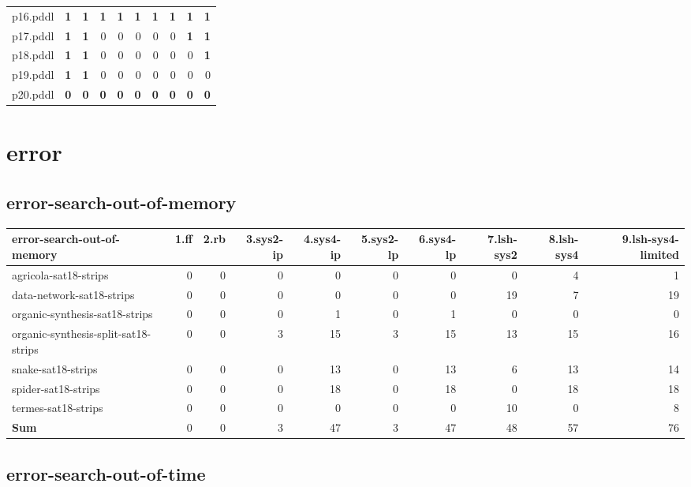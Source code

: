 \documentclass{article}
\begin{document}
\begin{tabular}{@{}lrrrrrrrrr@{}}
p16.pddl & \textbf{1} & \textbf{1} & \textbf{1} & \textbf{1} & \textbf{1} & \textbf{1} & \textbf{1} & \textbf{1} & \textbf{1} \\
p17.pddl & \textbf{1} & \textbf{1} & 0 & 0 & 0 & 0 & 0 & \textbf{1} & \textbf{1} \\
p18.pddl & \textbf{1} & \textbf{1} & 0 & 0 & 0 & 0 & 0 & 0 & \textbf{1} \\
p19.pddl & \textbf{1} & \textbf{1} & 0 & 0 & 0 & 0 & 0 & 0 & 0 \\
p20.pddl & \textbf{0} & \textbf{0} & \textbf{0} & \textbf{0} & \textbf{0} & \textbf{0} & \textbf{0} & \textbf{0} & \textbf{0} \\
\end{tabular}

\hypertarget{error}{}
\section*{error}

\hypertarget{error-error-search-out-of-memory}{}
\subsection*{error-search-out-of-memory}

\begin{tabular}{@{}lrrrrrrrrr@{}}
error-search-out-of-memory & 1.ff & 2.rb & 3.sys2-ip & 4.sys4-ip & 5.sys2-lp & 6.sys4-lp & 7.lsh-sys2 & 8.lsh-sys4 & 9.lsh-sys4-limited \\
\midrule
agricola-sat18-strips & 0 & 0 & 0 & 0 & 0 & 0 & 0 & 4 & 1 \\
data-network-sat18-strips & 0 & 0 & 0 & 0 & 0 & 0 & 19 & 7 & 19 \\
organic-synthesis-sat18-strips & 0 & 0 & 0 & 1 & 0 & 1 & 0 & 0 & 0 \\
organic-synthesis-split-sat18-strips & 0 & 0 & 3 & 15 & 3 & 15 & 13 & 15 & 16 \\
snake-sat18-strips & 0 & 0 & 0 & 13 & 0 & 13 & 6 & 13 & 14 \\
spider-sat18-strips & 0 & 0 & 0 & 18 & 0 & 18 & 0 & 18 & 18 \\
termes-sat18-strips & 0 & 0 & 0 & 0 & 0 & 0 & 10 & 0 & 8 \\
\textbf{Sum} & 0 & 0 & 3 & 47 & 3 & 47 & 48 & 57 & 76 \\
\end{tabular}

\hypertarget{error-error-search-out-of-time}{}
\subsection*{error-search-out-of-time}
\end{document}
